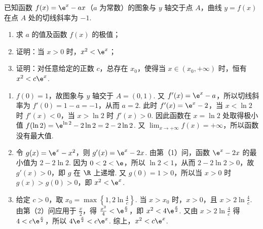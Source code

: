 \begin{problem}
已知函数 \( f(x) = \e^{x} - ax \)（\(a\) 为常数）的图象与 \(y\) 轴交于点 \(A\)，曲线 \( y = f(x) \) 在点 \(A\) 处的切线斜率为 \(-1\).

\begin{enumerate}
\item 求 \(a\) 的值及函数 \(f(x)\) 的极值；
\item 证明：当 \(x > 0\) 时，\(x^2 < \e^x\)；
\item 证明：对任意给定的正数 \(c\)，总存在 \(x_0\)，使得当 \(x \in (x_0, +\infty)\) 时，恒有 \(x^2 < c\e^x\).
\end{enumerate}

\begin{solution}
\begin{enumerate}
\item \(f(0)=1\)，故图象与 \(y\) 轴交于 \(A=(0,1)\). 又 \(f'(x)=\e^x-a\)，所以切线斜率为 \(f'(0)=1-a=-1\)，从而 \(a=2\). 此时 \(f'(x)=\e^x-2\)，当 \(x<\ln2\) 时 \(f'(x)<0\)，当 \(x>\ln2\) 时 \(f'(x)>0\). 因此函数在 \(x=\ln2\) 处取得极小值 \(f(\ln2)=\e^{\ln2}-2\ln2=2-2\ln2\). 又 \(\displaystyle\lim_{x\to+\infty}f(x)=+\infty\)，所以函数没有最大值.
\item 令 \(g(x)=\e^x-x^2\)，则 \(g'(x)=\e^x-2x\). 由第（1）问，函数 \(\e^x-2x\) 的最小值为 \(2-2\ln2\). 因为 \(0<2<\e\)，所以 \(\ln2<1\)，从而 \(2-2\ln2>0\)，故 \(g'(x)>0\)，即 \(g\) 在 \(\R\) 上递增. 又 \(g(0)=1>0\)，所以当 \(x>0\) 时 \(g(x)>g(0)>0\)，即 \(x^2<\e^x\).
\item 给定 \(c>0\)，取 \(x_0=\max\left\{1,2\ln\frac4c\right\}\). 当 \(x>x_0\) 时，\(x>0\)，且 \(x>2\ln\frac4c\). 由第（2）问应用于 \(\frac x2\)，得 \(\frac{x^2}{4}<\e^{\frac{x}{2}}\)，即 \(x^2<4\e^{\frac{x}{2}}\). 又由 \(x>2\ln\frac4c\) 得 \(4<c\e^{\frac{x}{2}}\)，所以 \(4\e^{\frac{x}{2}}<c\e^x\). 综上，\(x^2<c\e^x\).
\end{enumerate}
\end{solution}
\end{problem}
